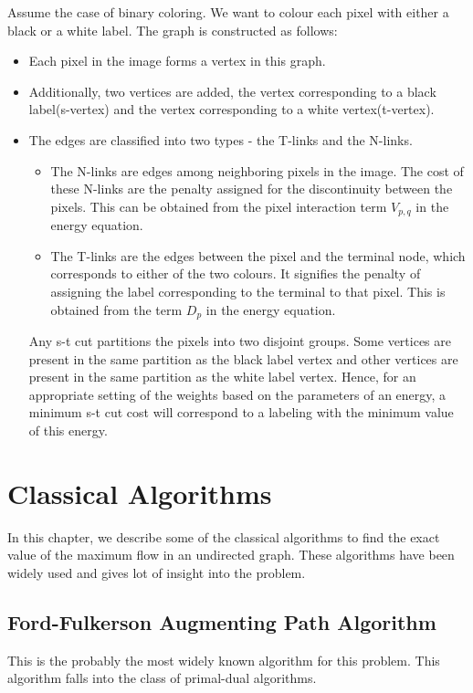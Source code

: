 \documentclass[BTech]{iitmdiss}
\begin{document}
	  Assume the case of binary coloring. We want to colour each pixel with either a black or a white label. The graph is constructed as follows:
	  \begin{itemize}
	   \item
	    Each pixel in the image forms a vertex in this graph.
	   \item
	    Additionally, two vertices are added, the vertex corresponding to a black label(s-vertex) and the vertex corresponding to a 
	    white vertex(t-vertex).
	   
	   \item 
	    The edges are classified into two types - the T-links and the N-links.
	    \begin{itemize}
	     \item 
		The N-links are edges among neighboring pixels in the image.
	    The cost of these N-links are the penalty assigned for the discontinuity between the pixels. This can be obtained from the pixel interaction
	    term $V_{p,q}$ in the energy equation.
	    \item
		The T-links are the edges between the pixel and the terminal node, which corresponds to either of
	    the two colours. It signifies the penalty of assigning the label corresponding to the terminal to that pixel. This is obtained from
	    the term $D_p$ in the energy equation.
	    \end{itemize}
	    
	    Any s-t cut partitions the pixels into two disjoint groups. Some vertices are present in the same partition as the black label vertex
	    and other vertices are present in the same partition as the white label vertex. Hence, for an appropriate setting of the weights based
	    on the parameters of an energy, a minimum s-t cut cost will correspond to a labeling with the minimum value of this energy.
	    
	    
	  \end{itemize}


	 \chapter{Classical Algorithms}
	  In this chapter, we describe some of the classical algorithms to find the exact value of the maximum flow in an undirected graph. These
	  algorithms have been widely used and gives lot of insight into the problem. 
	  
	  \section{Ford-Fulkerson Augmenting Path Algorithm}
	    This is the probably the most widely known algorithm for this problem. This algorithm falls into the class of primal-dual algorithms.
	    
\end{document}
